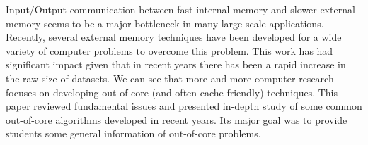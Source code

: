 
Input/Output communication between fast internal memory and slower external memory seems to be a major bottleneck in many large-scale applications.
Recently, several external memory techniques have been developed for a wide variety of computer problems to overcome this problem.
This work has had significant impact given that in recent years there has been a rapid increase in the raw size of datasets.
We can see that more and more computer research focuses on developing out-of-core (and often cache-friendly) techniques.
This paper reviewed fundamental issues and presented in-depth study of some common out-of-core algorithms developed in recent years.
Its major goal was to provide students some general information of out-of-core problems.